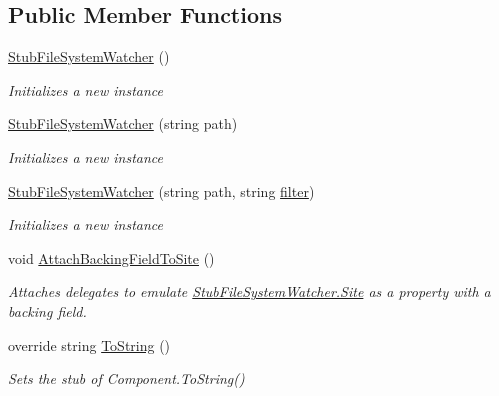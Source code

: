 \subsection*{Public Member Functions}
\begin{DoxyCompactItemize}
\item 
\hyperlink{class_system_1_1_i_o_1_1_fakes_1_1_stub_file_system_watcher_ad99a5364e86704d3edde0173f3251614}{Stub\-File\-System\-Watcher} ()
\begin{DoxyCompactList}\small\item\em Initializes a new instance\end{DoxyCompactList}\item 
\hyperlink{class_system_1_1_i_o_1_1_fakes_1_1_stub_file_system_watcher_a4eda28d496aaabe3ea819089c5c15c04}{Stub\-File\-System\-Watcher} (string path)
\begin{DoxyCompactList}\small\item\em Initializes a new instance\end{DoxyCompactList}\item 
\hyperlink{class_system_1_1_i_o_1_1_fakes_1_1_stub_file_system_watcher_a71d390f3e3b885b83a4a95cb10425d55}{Stub\-File\-System\-Watcher} (string path, string \hyperlink{jquery-1_810_82-vsdoc_8js_ac99d0cf56cab46114f5765a14e03ad6d}{filter})
\begin{DoxyCompactList}\small\item\em Initializes a new instance\end{DoxyCompactList}\item 
void \hyperlink{class_system_1_1_i_o_1_1_fakes_1_1_stub_file_system_watcher_af4117ae0575786571476024e74bcc5c2}{Attach\-Backing\-Field\-To\-Site} ()
\begin{DoxyCompactList}\small\item\em Attaches delegates to emulate \hyperlink{class_system_1_1_i_o_1_1_fakes_1_1_stub_file_system_watcher_ac104c4ba44f9b7f4b4760553d30417cf}{Stub\-File\-System\-Watcher.\-Site} as a property with a backing field.\end{DoxyCompactList}\item 
override string \hyperlink{class_system_1_1_i_o_1_1_fakes_1_1_stub_file_system_watcher_ac92c27115b2f3cbe1ca50047b349259a}{To\-String} ()
\begin{DoxyCompactList}\small\item\em Sets the stub of Component.\-To\-String()\end{DoxyCompactList}\end{DoxyCompactItemize}

